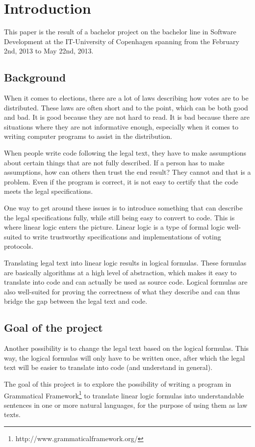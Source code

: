 \chapter{Introduction}
\label{01}

This paper is the result of a bachelor project on the bachelor line in Software Development at the IT-University of Copenhagen spanning from the February 2nd, 2013 to May 22nd, 2013.

\section{Background}
\label{01_01}

When it comes to elections, there are a lot of laws describing how votes are to be distributed. These laws are often short and to the point, which can be both good and bad. It is good because they are not hard to read. It is bad because there are situations where they are not informative enough, especially when it comes to writing computer programs to assist in the distribution.

When people write code following the legal text, they have to make assumptions about certain things that are not fully described. If a person has to make assumptions, how can others then trust the end result? They cannot and that is a problem. Even if the program is correct, it is not easy to certify that the code meets the legal specifications.

One way to get around these issues is to introduce something that can describe the legal specifications fully, while still being easy to convert to code. This is where linear logic enters the picture. Linear logic is a type of formal logic well-suited to write trustworthy specifications and implementations of voting protocols. 

Translating legal text into linear logic results in logical formulas. These formulas are basically algorithms at a high level of abstraction, which makes it easy to translate into code and can actually be used as source code. Logical formulas are also well-suited for proving the correctness of what they describe and can thus bridge the gap between the legal text and code. 

\section{Goal of the project}
\label{01_02}

Another possibility is to change the legal text based on the logical formulas. This way, the logical formulas will only have to be written once, after which the legal text will be easier to translate into code (and understand in general).

The goal of this project is to explore the possibility of writing a program in Grammatical Framework\footnote{http://www.grammaticalframework.org/} to translate linear logic formulas into understandable sentences in one or more natural languages, for the purpose of using them as law texts.